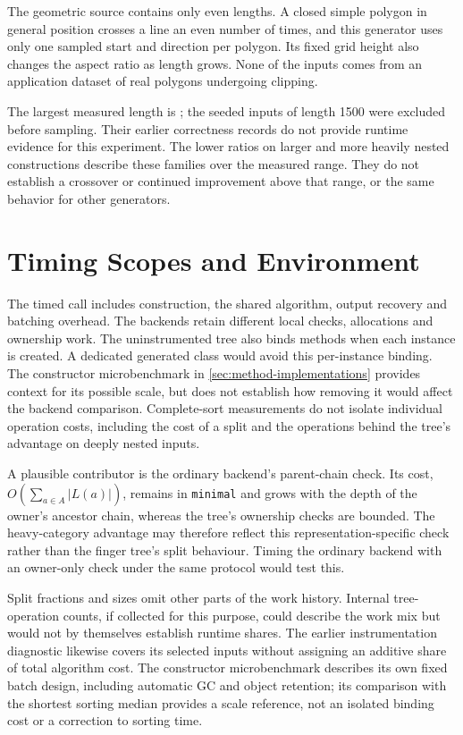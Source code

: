 The geometric source contains only even lengths. A closed simple polygon in
general position crosses a line an even number of times, and this generator
uses only one sampled start and direction per polygon. Its fixed grid height
also changes the aspect ratio as length grows. None of the inputs comes from
an application dataset of real polygons undergoing clipping.

The largest measured length is \UnifiedMaxN{}; the \UnifiedExcluded{} seeded
inputs of length 1500 were excluded before sampling. Their earlier correctness
records do not provide runtime evidence for this experiment. The lower ratios
on larger and more heavily nested constructions describe these families over
the measured range. They do not establish a crossover or continued improvement
above that range, or the same behavior for other generators.

\section{Timing Scopes and Environment}
\label{sec:limitations-timing-scopes}
\label{sec:limitations-execution}

The timed call includes construction, the shared algorithm, output recovery
and batching overhead. The backends retain different local checks,
allocations and ownership work. The uninstrumented tree also binds methods
when each instance is created. A dedicated generated class would avoid this
per-instance binding. The constructor microbenchmark in
\cref{sec:method-implementations} provides context for its possible scale,
but does not establish how removing it would affect the backend comparison.
Complete-sort measurements do not isolate
individual operation costs, including the cost of a split and the operations
behind the tree's advantage on deeply nested inputs.

A plausible contributor is the ordinary backend's parent-chain check. Its
cost, $O(\sum_{a\in A}|L(a)|)$, remains in \texttt{minimal} and grows with the
depth of the owner's ancestor chain, whereas the tree's ownership checks
are bounded. The heavy-category advantage may therefore reflect this
representation-specific check rather than the finger tree's split behaviour.
Timing the ordinary backend with an owner-only check under the same protocol
would test this.

Split fractions and
sizes omit other parts of the work history. Internal tree-operation counts, if collected
for this purpose, could describe the work mix but would not by themselves
establish runtime shares. The earlier instrumentation
diagnostic likewise covers its selected inputs without assigning an additive
share of total algorithm cost. The constructor microbenchmark describes its
own fixed batch design, including automatic GC and object retention; its
comparison with the shortest sorting median provides a scale reference,
not an isolated binding cost or a correction to sorting time.

